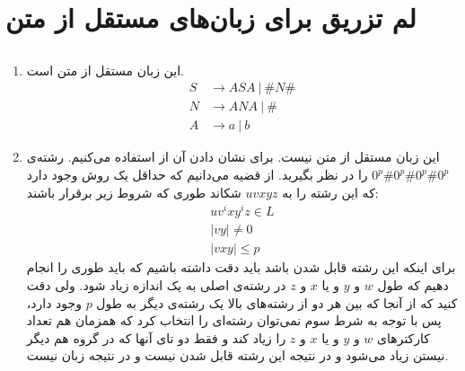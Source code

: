 \section{لم تزریق برای زبان‌های مستقل از متن}
\subsection{}
\begin{enumerate}
    \item این زبان مستقل از متن است.
    \begin{align*}
        S &\rightarrow ASA ~|~ \#N\#\\
        N &\rightarrow ANA ~|~ \#\\
        A &\rightarrow a ~|~ b
    \end{align*}
    \item این زبان مستقل از متن نیست. برای نشان دادن آن از
    استفاده می‌کنیم. رشته‌ی
    $0^p\#0^p\#0^p\#0^p$
    را در نظر بگیرید. از قضیه می‌دانیم که حداقل یک روش وجود دارد که این رشته را به
    $uvxyz$
    شکاند طوری که شروط زیر برقرار باشند:
    \begin{gather*}
        uv^ixy^iz \in L\\
        |vy| \neq 0\\
        |vxy| \le p
    \end{gather*}
    برای اینکه این رشته قابل
    شدن باشد باید دقت داشته باشیم که باید طوری
    را انجام دهیم که طول
    $w$ و $y$
    و یا
    $x$ و $z$
    در رشته‌ی اصلی به یک اندازه زیاد شود. ولی دقت کنید که از آنجا که بین هر دو از رشته‌های بالا
    یک رشته‌ی دیگر به طول
    $p$
    وجود دارد، پس با توجه به شرط سوم
    نمی‌توان رشته‌ای را انتخاب کرد که همزمان هم تعداد کارکتر‌های
    $w$ و $y$
    و یا
    $x$ و $z$
    را زیاد کند و فقط دو تای آنها که در گروه هم دیگر نیستن زیاد می‌شود و در نتیجه این رشته قابل
    شدن نیست و در نتیجه زبان
    نیست.
\end{enumerate}
